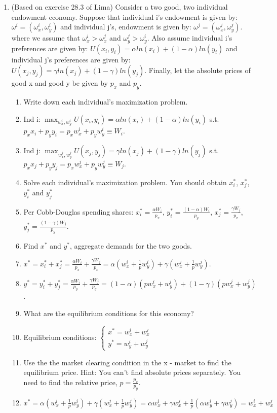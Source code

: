 \documentclass{article}
\begin{document}
\begin{enumerate}
\item (Based on exercise 28.3 of Lima) Consider a two good, two individual endowment economy. Suppose that individual i's endowment is given by: $\omega^i=(\omega_x^i, \omega_y^i)$ and individual j's, endowment is given by: $\omega^j=(\omega_x^j, \omega_y^j)$. where we assume that $\omega_x^i>\omega_x^j$ and $\omega_y^j>\omega_y^i$. Also assume individual i's preferences are given by: $U (x_i, y_i) = \alpha ln (x_i) + (1 - \alpha) ln (y_i)$ and individual j's preferences are given by: $U (x_j, y_j) = \gamma ln (x_j) + (1 - \gamma) ln (y_j)$. Finally, let the absolute prices of good x and good y be given by $p_x$ and $p_y$.
\begin{enumerate}[label=(\alph*)]
\item Write down each individual's maximization problem.
\item[] Ind i: $\max_{w_x^i,w_y^i}U(x_i,y_i)=\alpha ln(x_i)+(1-\alpha)ln(y_i)$ s.t. $p_xx_i+p_yy_i=p_xw_x^i+p_yw_y^i\equiv W_i$.
\item[] Ind j: $\max_{w_x^j,w_y^j}U(x_j,y_j)=\gamma ln(x_j)+(1-\gamma)ln(y_j)$ s.t. $p_xx_j+p_yy_j=p_xw_x^j+p_yw_y^j\equiv W_j$.
\item Solve each individual's maximization problem. You should obtain $x_i^*$, $x_j^*$, $y_i^*$ and $y_j^*$
\item[] Per Cobb-Douglas spending shares: $x^*_i=\frac{\alpha W_i}{p_x}$, $y^*_i=\frac{(1-\alpha)W_i}{p_y}$, $x^*_j=\frac{\gamma W_j}{p_x}$, $y^*_j=\frac{(1-\gamma)W_j}{p_y}$.
\item Find $x^*$ and $y^*$, aggregate demands for the two goods.
\item[] $x^*=x^*_i+x^*_j=\frac{\alpha W_i}{p_x}+\frac{\gamma W_j}{p_x}=\alpha(w_x^i+\frac{1}{p}w_y^i)+\gamma(w_x^j+\frac{1}{p}w_y^j)$.
\item[] $y^*=y^*_i+y^*_j=\frac{\alpha W_i}{p_y}+\frac{\gamma W_j}{p_y}=(1-\alpha)(pw_x^i+w_y^i)+(1-\gamma)(pw_x^j+w_y^j)$.
\item What are the equilibrium conditions for this economy?
\item[] Equilibrium conditions: $\begin{cases}
    x^*=w_x^i+w_x^j \\ y^*=w_y^i+w_y^j
\end{cases}$
\item Use the the market clearing condition in the x - market to find the equilibrium price. Hint: You can't find absolute prices separately. You need to find the relative price, $p=\frac{p_x}{p_y}$.
\item[] $x^*=\alpha(w_x^i+\frac{1}{p}w_y^i)+\gamma(w_x^j+\frac{1}{p}w_y^j)=\alpha w_x^i+\gamma w_x^j+\frac{1}{p}(\alpha w_y^i+\gamma w_y^j)=w_x^i+w_x^j$

\end{enumerate}
\end{enumerate}
\end{document}
